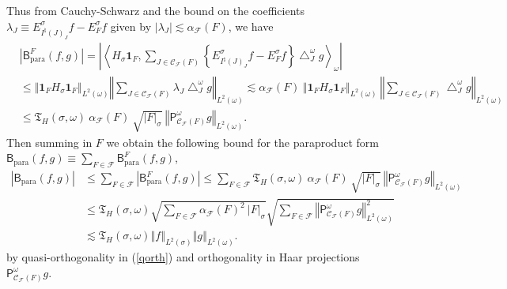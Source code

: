\documentclass{amsart}%
\theoremstyle{plain}
\numberwithin{equation}{section}
\begin{document}
Thus from Cauchy-Schwarz and the bound on the coefficients $\lambda_{J}\equiv
E_{I^{\natural}\left(  J\right)  _{J}}^{\sigma}f-E_{F}^{\sigma}f$ given by
$\left\vert \lambda_{J}\right\vert \lesssim\alpha_{\mathcal{F}}\left(
F\right)  $, we have%
\begin{align}
& \left\vert \mathsf{B}_{\operatorname*{para}}^{F}\left(  f,g\right)
\right\vert =\left\vert \left\langle H_{\sigma}\mathbf{1}_{F},\sum
_{J\in\mathcal{C}_{\mathcal{F}}\left(  F\right)  }\left\{  E_{I^{\natural
}\left(  J\right)  _{J}}^{\sigma}f-E_{F}^{\sigma}f\right\}  \bigtriangleup
_{J}^{\omega}g\right\rangle _{\omega}\right\vert \label{est para}\\
& \leq\left\Vert \mathbf{1}_{F}H_{\sigma}\mathbf{1}_{F}\right\Vert
_{L^{2}\left(  \omega\right)  }\left\Vert \sum_{J\in\mathcal{C}_{\mathcal{F}%
}\left(  F\right)  }\lambda_{J}\bigtriangleup_{J}^{\omega}g\right\Vert
_{L^{2}\left(  \omega\right)  }\lesssim\alpha_{\mathcal{F}}\left(  F\right)
\ \left\Vert \mathbf{1}_{F}H_{\sigma}\mathbf{1}_{F}\right\Vert _{L^{2}\left(
\omega\right)  }\ \left\Vert \sum_{J\in\mathcal{C}_{\mathcal{F}}\left(
F\right)  }\bigtriangleup_{J}^{\omega}g\right\Vert _{L^{2}\left(
\omega\right)  }\nonumber\\
& \leq\mathfrak{T}_{H}\left(  \sigma,\omega\right)  \ \alpha_{\mathcal{F}%
}\left(  F\right)  \ \sqrt{\left\vert F\right\vert _{\sigma}}\ \left\Vert
\mathsf{P}_{\mathcal{C}_{\mathcal{F}}\left(  F\right)  }^{\omega}g\right\Vert
_{L^{2}\left(  \omega\right)  }.\nonumber
\end{align}
Then summing in $F$ we obtain the following bound for the paraproduct form
$\mathsf{B}_{\operatorname*{para}}\left(  f,g\right)  \equiv\sum
_{F\in\mathcal{F}}\mathsf{B}_{\operatorname*{para}}^{F}\left(  f,g\right)  $,%
\begin{align*}
\left\vert \mathsf{B}_{\operatorname*{para}}\left(  f,g\right)  \right\vert  &
\leq\sum_{F\in\mathcal{F}}\left\vert \mathsf{B}_{\operatorname*{para}}%
^{F}\left(  f,g\right)  \right\vert \leq\sum_{F\in\mathcal{F}}\mathfrak{T}%
_{H}\left(  \sigma,\omega\right)  \ \alpha_{\mathcal{F}}\left(  F\right)
\ \sqrt{\left\vert F\right\vert _{\sigma}}\ \left\Vert \mathsf{P}%
_{\mathcal{C}_{\mathcal{F}}\left(  F\right)  }^{\omega}g\right\Vert
_{L^{2}\left(  \omega\right)  }\\
& \leq\mathfrak{T}_{H}\left(  \sigma,\omega\right)  \sqrt{\sum_{F\in
\mathcal{F}}\alpha_{\mathcal{F}}\left(  F\right)  ^{2}\ \left\vert
F\right\vert _{\sigma}}\sqrt{\sum_{F\in\mathcal{F}}\left\Vert \mathsf{P}%
_{\mathcal{C}_{\mathcal{F}}\left(  F\right)  }^{\omega}g\right\Vert
_{L^{2}\left(  \omega\right)  }^{2}}\\
& \lesssim\mathfrak{T}_{H}\left(  \sigma,\omega\right)  \left\Vert
f\right\Vert _{L^{2}(\sigma)}\left\Vert g\right\Vert _{L^{2}(\omega)}.
\end{align*}
by quasi-orthogonality in (\ref{qorth}) and orthogonality in Haar projections
$\mathsf{P}_{\mathcal{C}_{\mathcal{F}}\left(  F\right)  }^{\omega}g$.
\end{document}
